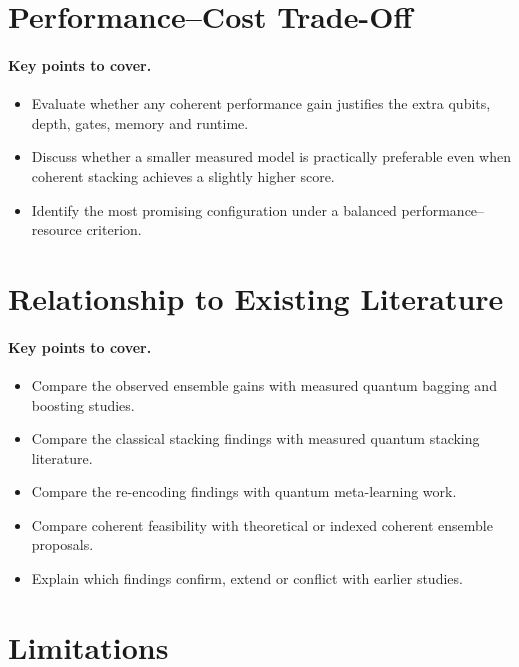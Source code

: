 \documentclass[]{UCD_CS_MSc_AAI_Report}
\newcommand{\sectionbrief}{\paragraph{Key points to cover.}}
\begin{document}
\section{Performance--Cost Trade-Off}
\label{sec:discussion-cost}

\sectionbrief
\begin{itemize}
    \item Evaluate whether any coherent performance gain justifies the extra qubits, depth, gates, memory and runtime.
    \item Discuss whether a smaller measured model is practically preferable even when coherent stacking achieves a slightly higher score.
    \item Identify the most promising configuration under a balanced performance--resource criterion.
\end{itemize}

\section{Relationship to Existing Literature}
\label{sec:discussion-literature}

\sectionbrief
\begin{itemize}
    \item Compare the observed ensemble gains with measured quantum bagging and boosting studies.
    \item Compare the classical stacking findings with measured quantum stacking literature.
    \item Compare the re-encoding findings with quantum meta-learning work.
    \item Compare coherent feasibility with theoretical or indexed coherent ensemble proposals.
    \item Explain which findings confirm, extend or conflict with earlier studies.
\end{itemize}

\section{Limitations}
\label{sec:discussion-limitations}
\end{document}
